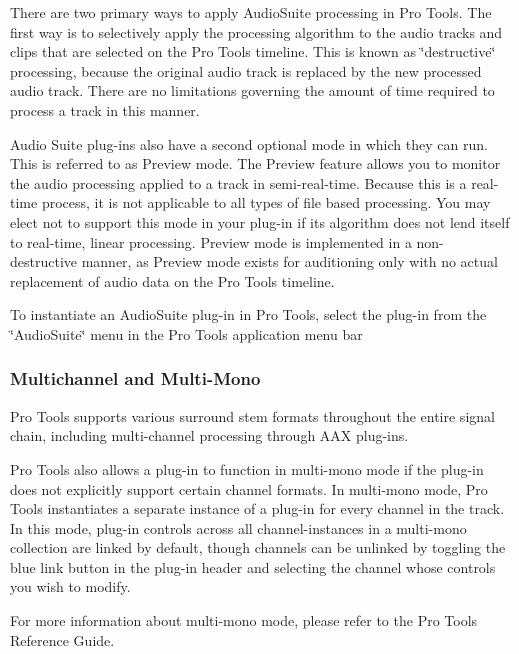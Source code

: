 There are two primary ways to apply Audio\+Suite processing in Pro Tools. The first way is to selectively apply the processing algorithm to the audio tracks and clips that are selected on the Pro Tools timeline. This is known as \char`\"{}destructive\char`\"{} processing, because the original audio track is replaced by the new processed audio track. There are no limitations governing the amount of time required to process a track in this manner.

Audio Suite plug-\/ins also have a second optional mode in which they can run. This is referred to as Preview mode. The Preview feature allows you to monitor the audio processing applied to a track in semi-\/real-\/time. Because this is a real-\/time process, it is not applicable to all types of file based processing. You may elect not to support this mode in your plug-\/in if its algorithm does not lend itself to real-\/time, linear processing. Preview mode is implemented in a non-\/ destructive manner, as Preview mode exists for auditioning only with no actual replacement of audio data on the Pro Tools timeline.

To instantiate an Audio\+Suite plug-\/in in Pro Tools, select the plug-\/in from the \char`\"{}\+Audio\+Suite\char`\"{} menu in the Pro Tools application menu bar

\hypertarget{a00830_subsection__multichannel_and_multimono}{}\subsubsection{Multichannel and Multi-\/\+Mono}\label{a00830_subsection__multichannel_and_multimono}
 Pro Tools supports various surround stem formats throughout the entire signal chain, including multi-\/channel processing through A\+AX plug-\/ins.

Pro Tools also allows a plug-\/in to function in multi-\/mono mode if the plug-\/in does not explicitly support certain channel formats. In multi-\/mono mode, Pro Tools instantiates a separate instance of a plug-\/in for every channel in the track. In this mode, plug-\/in controls across all channel-\/instances in a multi-\/mono collection are linked by default, though channels can be unlinked by toggling the blue link button in the plug-\/in header and selecting the channel whose controls you wish to modify.

For more information about multi-\/mono mode, please refer to the Pro Tools Reference Guide.



